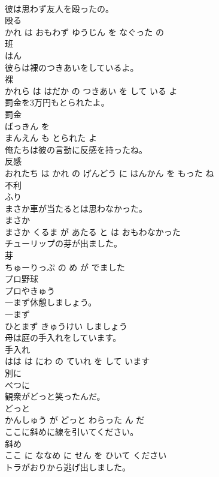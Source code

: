 \documentclass[8pt]{extreport}
\begin{document}
\begin{CJK}{UTF8}{min}
\\	彼は思わず友人を殴ったの。	
\\	殴る 
\\	かれ は おもわず ゆうじん を なぐった の			
\\	班	
\\	はん		
\\	彼らは裸のつきあいをしているよ。	
\\	裸 
\\	かれら は はだか の つきあい を して いる よ			
\\	罰金を3万円もとられたよ。	
\\	罰金 
\\	ばっきん を 
\\	まんえん も とられた よ			
\\	俺たちは彼の言動に反感を持ったね。	
\\	反感 
\\	おれたち は かれ の げんどう に はんかん を もった ね			
\\	不利	
\\	ふり		
\\	まさか車が当たるとは思わなかった。	
\\	まさか 
\\	まさか くるま が あたる と は おもわなかった			
\\	チューリップの芽が出ました。	
\\	芽 
\\	ちゅーりっぷ の め が でました			
\\	プロ野球	
\\	プロやきゅう		
\\	一まず休憩しましょう。	
\\	一まず 
\\	ひとまず きゅうけい しましょう			
\\	母は庭の手入れをしています。	
\\	手入れ 
\\	はは は にわ の ていれ を して います			
\\	別に	
\\	べつに		
\\	観衆がどっと笑ったんだ。	
\\	どっと 
\\	かんしゅう が どっと わらった ん だ			
\\	ここに斜めに線を引いてください。	
\\	斜め 
\\	ここ に ななめ に せん を ひいて ください			
\\	トラがおりから逃げ出しました。	

\end{CJK}
\end{document}
